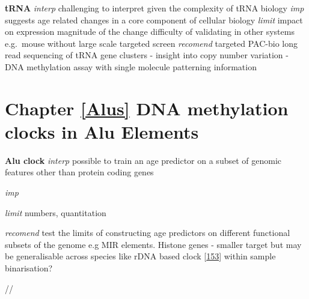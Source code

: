 \documentclass[
]{book}
\begin{document}
\textbf{tRNA}
\emph{interp}
challenging to interpret given the complexity of tRNA biology
\emph{imp}
suggests age related changes in a core component of cellular biology
\emph{limit}
impact on expression
magnitude of the change
difficulty of validating in other systems e.g.~mouse without large scale targeted screen
\emph{recomend}
targeted PAC-bio long read sequencing of tRNA gene clusters
- insight into copy number variation
- DNA methylation assay with single molecule patterning information

\hypertarget{chapter-refalus-dna-methylation-clocks-in-alu-elements}{%
\section{Chapter \ref{Alus} DNA methylation clocks in Alu Elements}\label{chapter-refalus-dna-methylation-clocks-in-alu-elements}}

\textbf{Alu clock}
\emph{interp}
possible to train an age predictor on a subset of genomic features other than protein coding genes

\emph{imp}

\emph{limit}
numbers, quantitation

\emph{recomend}
test the limits of constructing age predictors on different functional subsets of the genome e.g MIR elements. Histone genes - smaller target but may be generalisable across species like rDNA based clock {[}\protect\hyperlink{ref-Wang2019}{153}{]}
within sample binarisation?

//
\end{document}
